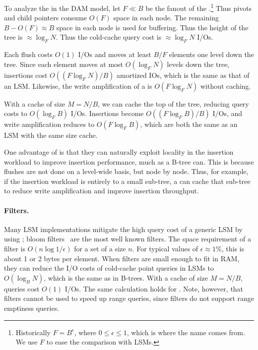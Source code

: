 To analyze the \bet in the DAM model, let $F\ll B$ be the fanout of
the \bet.\footnote{Historically $F = B^\epsilon$, where $0\leq
  \epsilon\leq 1$, which is where the name comes from.  We use $F$ to
  ease the comparison with LSMs.}  Thus pivots and child pointers
consume $O(F)$ space in each node.  The remaining $B-O(F)\approx B$
space in each node is used for buffering.  Thus the height of the tree
is $\approx\log_{F}N$.  Thus the cold-cache query cost is
$\approx\log_F N$ I/Os.  

Each flush costs $O(1)$ I/Os and moves at least $B/F$ elements one
level down the tree.  Since each element moves at most $O(\log_F N)$
levels down the tree, insertions cost $O((F\log_F N)/B)$ amortized
IOs, which is the same as that of an LSM.  Likewise, the write
amplification of a \bet is $O(F\log_F N)$ without caching.

With a cache of size $M=N/B$, we can cache the top of the tree,
reducing query costs to $O(\log_F B)$ I/Os.  Insertions become
$O((F\log_F B)/B)$ I/Os, and write amplification reduces to
$O(F\log_F B)$, which are both the same as an LSM with the same size cache.

One advantage of \bets is that they can naturally exploit locality in
the insertion workload to improve insertion performance, much as a
B-tree can.  This is because flushes are not done on a level-wide
basis, but node by node.  Thus, for example, if the insertion workload
is entirely to a small sub-tree, a \bet can cache that sub-tree to
reduce write amplification and improve insertion throughput.

\paragraph{Filters.} Many LSM implementations mitigate the high
query cost of a generic LSM by using ; bloom filters~\cite{DBLP:journals/cacm/Bloom70} are the most well
known filters.
  The space requirement of a filter is $O(n
\log 1/\epsilon)$ for a set of a size $n$.  For typical values of
$\epsilon\approx 1\%$, this is about 1 or 2 bytes per element.
When filters are small enough to fit in RAM, they can reduce the I/O costs
of cold-cache point queries in LSMs to $O(\log_B N)$,
which is the same as in B-trees.  With a cache of size $M=N/B$,
queries cost $O(1)$ I/Os.  The same calculation holds for \bets. Note, however, that filters cannot
be used to speed up range queries, since filters do not support range
emptiness queries.


